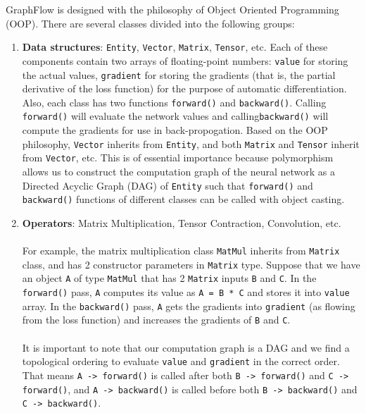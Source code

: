 \documentclass[a4paper]{article}
\begin{document}
GraphFlow is designed with the philosophy of Object Oriented Programming (OOP). There are several classes divided into the following groups:
\begin{enumerate}
	\item \textbf{Data structures}: \texttt{Entity}, \texttt{Vector}, \texttt{Matrix}, \texttt{Tensor}, etc. Each of these components contain two arrays of floating-point numbers: \texttt{value} for storing the actual values, \texttt{gradient} for storing the gradients (that is, the partial derivative of the loss function) for the purpose of automatic differentiation. Also, each class has two functions \texttt{forward()} and \texttt{backward()}. Calling \texttt{forward()} will evaluate the network values and calling\texttt{backward()} will compute the gradients for use in back-propogation. Based on the OOP philosophy, \texttt{Vector} inherits from \texttt{Entity}, and both \texttt{Matrix} and \texttt{Tensor} inherit from \texttt{Vector}, etc. This is of essential importance because polymorphism allows us to construct the computation graph of the neural network as a Directed Acyclic Graph (DAG) of \texttt{Entity} such that \texttt{forward()} and \texttt{backward()} functions of different classes can be called with object casting. 
	
	\item \textbf{Operators}: Matrix Multiplication, Tensor Contraction, Convolution, etc. \\ \\
	For example, the matrix multiplication class \texttt{MatMul} inherits from \texttt{Matrix} class, and has 2 constructor parameters in \texttt{Matrix} type. Suppose that we have an object \texttt{A} of type \texttt{MatMul} that has 2 \texttt{Matrix} inputs \texttt{B} and \texttt{C}. In the \texttt{forward()} pass, \texttt{A} computes its value as \texttt{A = B * C} and stores it into \texttt{value} array. In the \texttt{backward()} pass, \texttt{A} gets the gradients into \texttt{gradient} (as flowing from the loss function) and increases the gradients of \texttt{B} and \texttt{C}. \\ \\
	It is important to note that our computation graph is a DAG and we find a topological ordering to evaluate \texttt{value} and \texttt{gradient} in the correct order. That means \texttt{A -> forward()} is called after both \texttt{B -> forward()} and \texttt{C -> forward()}, and \texttt{A -> backward()} is called before both \texttt{B -> backward()} and \texttt{C -> backward()}.
	

\end{enumerate}
\end{document}
